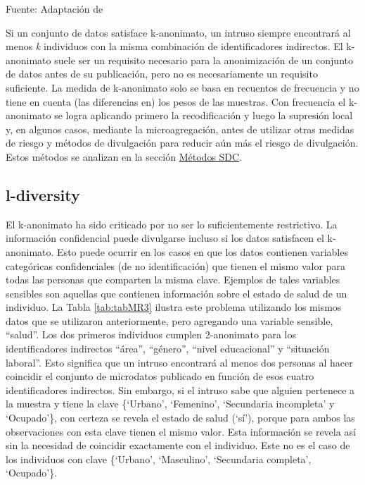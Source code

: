\documentclass[]{book}
\theoremstyle{definition}
\theoremstyle{definition}
\theoremstyle{definition}
\theoremstyle{definition}
\theoremstyle{remark}
\begin{document}
Fuente: Adaptación de \citep[p.32]{benschop}

Si un conjunto de datos satisface k-anonimato, un intruso siempre encontrará al menos \emph{k} individuos con la misma combinación de identificadores indirectos. El k-anonimato suele ser un requisito necesario para la anonimización de un conjunto de datos antes de su publicación, pero no es necesariamente un requisito suficiente. La medida de k-anonimato solo se basa en recuentos de frecuencia y no tiene en cuenta (las diferencias en) los pesos de las muestras. Con frecuencia el k-anonimato se logra aplicando primero la recodificación y luego la supresión local y, en algunos casos, mediante la microagregación, antes de utilizar otras medidas de riesgo y métodos de divulgación para reducir aún más el riesgo de divulgación. Estos métodos se analizan en la sección \protect\hyperlink{muxe9todos-sdc}{Métodos SDC}.

\hypertarget{l-diversity}{%
\subsection{l-diversity}\label{l-diversity}}

El k-anonimato ha sido criticado por no ser lo suficientemente restrictivo. La información confidencial puede divulgarse incluso si los datos satisfacen el k-anonimato. Esto puede ocurrir en los casos en que los datos contienen variables categóricas confidenciales (de no identificación) que tienen el mismo valor para todas las personas que comparten la misma clave. Ejemplos de tales variables sensibles son aquellas que contienen información sobre el estado de salud de un individuo. La Tabla \ref{tab:tabMR3} ilustra este problema utilizando los mismos datos que se utilizaron anteriormente, pero agregando una variable sensible, ``salud''. Los dos primeros individuos cumplen 2-anonimato para los identificadores indirectos ``área'', ``género'', ``nivel educacional'' y ``situación laboral''. Esto significa que un intruso encontrará al menos dos personas al hacer coincidir el conjunto de microdatos publicado en función de esos cuatro identificadores indirectos. Sin embargo, si el intruso sabe que alguien pertenece a la muestra y tiene la clave \{`Urbano', `Femenino', `Secundaria incompleta' y `Ocupado'\}, con certeza se revela el estado de salud (`sí'), porque para ambos las observaciones con esta clave tienen el mismo valor. Esta información se revela así sin la necesidad de coincidir exactamente con el individuo. Este no es el caso de los individuos con clave \{`Urbano', `Masculino', `Secundaria completa', `Ocupado'\}.
\end{document}
